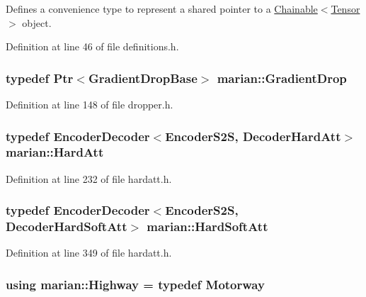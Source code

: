 Defines a convenience type to represent a shared pointer to a \hyperlink{classmarian_1_1Chainable}{Chainable$<$\+Tensor$>$} object. 



Definition at line 46 of file definitions.\+h.

\subsubsection[{\texorpdfstring{Gradient\+Drop}{GradientDrop}}]{\setlength{\rightskip}{0pt plus 5cm}typedef {\bf Ptr}$<${\bf Gradient\+Drop\+Base}$>$ {\bf marian\+::\+Gradient\+Drop}}\hypertarget{namespacemarian_a000da7078105881168a3f17ce1b148bb}{}\label{namespacemarian_a000da7078105881168a3f17ce1b148bb}


Definition at line 148 of file dropper.\+h.

\subsubsection[{\texorpdfstring{Hard\+Att}{HardAtt}}]{\setlength{\rightskip}{0pt plus 5cm}typedef {\bf Encoder\+Decoder}$<${\bf Encoder\+S2S}, {\bf Decoder\+Hard\+Att}$>$ {\bf marian\+::\+Hard\+Att}}\hypertarget{namespacemarian_a8c218ad930486503729d954880f0b29d}{}\label{namespacemarian_a8c218ad930486503729d954880f0b29d}


Definition at line 232 of file hardatt.\+h.

\subsubsection[{\texorpdfstring{Hard\+Soft\+Att}{HardSoftAtt}}]{\setlength{\rightskip}{0pt plus 5cm}typedef {\bf Encoder\+Decoder}$<${\bf Encoder\+S2S}, {\bf Decoder\+Hard\+Soft\+Att}$>$ {\bf marian\+::\+Hard\+Soft\+Att}}\hypertarget{namespacemarian_a510c9e6926b0b3808cea5dff79e8d984}{}\label{namespacemarian_a510c9e6926b0b3808cea5dff79e8d984}


Definition at line 349 of file hardatt.\+h.

\subsubsection[{\texorpdfstring{Highway}{Highway}}]{\setlength{\rightskip}{0pt plus 5cm}using {\bf marian\+::\+Highway} = typedef {\bf Motorway}}\hypertarget{namespacemarian_a7d8e9572693ffcfd9836ee46cd4b81ce}{}\label{namespacemarian_a7d8e9572693ffcfd9836ee46cd4b81ce}


